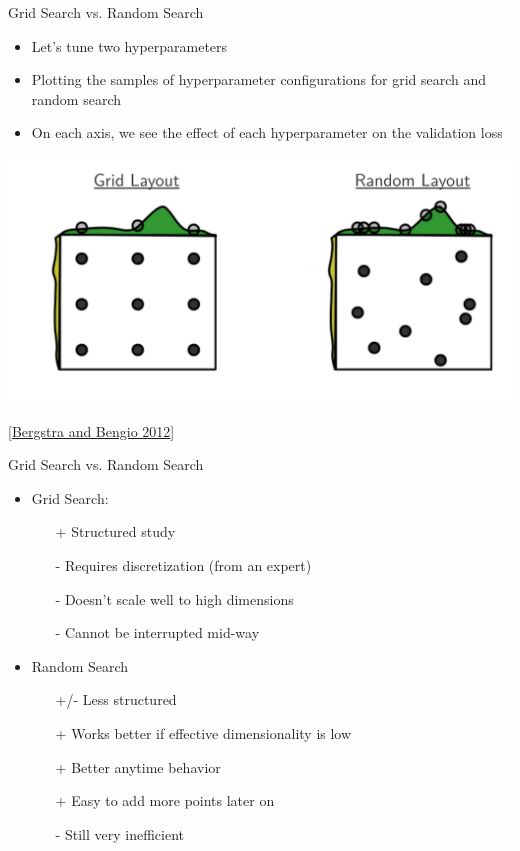 \documentclass[aspectratio=169]{../latex_main/tntbeamer}  %
\begin{document}
\begin{frame}[c]{Grid Search vs. Random Search}

\vspace{-1em}
\begin{itemize}
    \item Let's tune two hyperparameters 
    \item Plotting the samples of hyperparameter configurations for grid search and random search
    \item On each axis, we see the effect of each hyperparameter on the \alert{validation loss}
\end{itemize}

\centering
\includegraphics[width=.72\textwidth]{grid_random.jpg}

\footnotesize
[\href{https://www.jmlr.org/papers/volume13/bergstra12a/bergstra12a.pdf}{Bergstra and Bengio 2012}]


\end{frame}
\begin{frame}[c]{Grid Search vs. Random Search}
	
\begin{itemize}
    \item Grid Search:
    \begin{itemize}
        \item[+] Structured study
        \item[-] Requires discretization (from an expert)
        \item[-] Doesn't scale well to high dimensions
        \item[-] Cannot be interrupted mid-way
    \end{itemize}
    \item Random Search
    \begin{itemize}
        \item[+/-] Less structured
        \item[+] Works better if effective dimensionality is low 
        \item[+] Better anytime behavior
        \item[+] Easy to add more points later on
        \item[-] Still very inefficient
    \end{itemize}
\end{itemize}
\end{frame}
\end{document}
